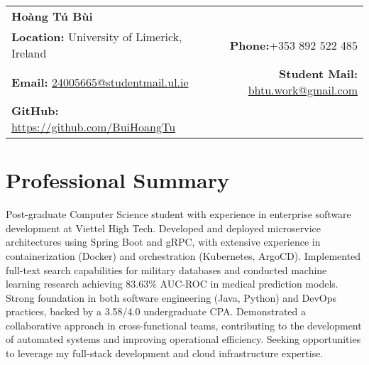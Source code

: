 \documentclass[a4paper,11pt]{article}
\makeatletter
\newcommand{\name}{Hoàng Tú Bùi} %
\newcommand{\phone}{+353 892 522 485} %
\newcommand{\emaila}{24005665@studentmail.ul.ie} %
\newcommand{\emailb}{bhtu.work@gmail.com} %
\newcommand{\github}{https://github.com/BuiHoangTu} %
\makeatother
\begin{document}
\selectfont
\parbox{2.35cm}{%


}\parbox{\dimexpr\linewidth\relax}{
\begin{tabularx}{\linewidth}{L R}
    \textbf{\LARGE \name} 
    & {}
    \\
    
    \textbf{Location:} University of Limerick, Ireland
    & \textbf{Phone:}\phone
    \\
    
    \textbf{Email:} \href{mailto:\emaila}{\emaila}
    & \textbf{Student Mail:} \href{mailto:\emailb}{\emailb}
    \\  

    \textbf{GitHub:} \href{\github}{\github} 
    & {}
    \\
    
    
\end{tabularx}
}

\vspace{-2mm}
\setlength{\tabcolsep}{5pt} %

\section{\textbf{Professional Summary}}
Post-graduate Computer Science student with experience in enterprise software development at Viettel High Tech. 
Developed and deployed microservice architectures using Spring Boot and gRPC, with extensive experience in containerization (Docker) and orchestration (Kubernetes, ArgoCD).
Implemented full-text search capabilities for military databases and conducted machine learning research achieving 83.63\% AUC-ROC in medical prediction models. 
Strong foundation in both software engineering (Java, Python) and DevOps practices, backed by a 3.58/4.0 undergraduate CPA.
Demonstrated a collaborative approach in cross-functional teams, contributing to the development of automated systems and improving operational efficiency.
Seeking opportunities to leverage my full-stack development and cloud infrastructure expertise.
\end{document}
